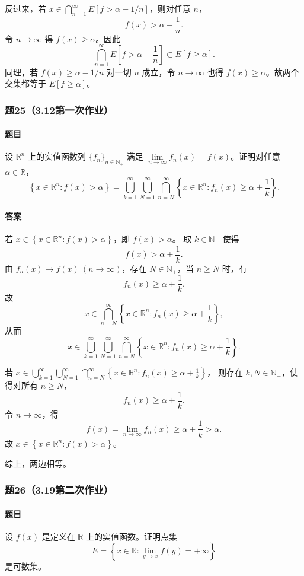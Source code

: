 \documentclass{article}
\newcommand{\R}{\mathbb{R}}
\begin{document}
	反过来，若 $x\in\bigcap_{n=1}^{\infty}E[f>\alpha-1/n]$，则对任意 $n$，
	\[
	f(x)>\alpha-\frac1n.
	\]
	令 $n\to\infty$ 得 $f(x)\ge\alpha$。因此
	\[
	\bigcap_{n=1}^{\infty}E\left[f>\alpha-\frac1n\right]
	\subset E[f\ge\alpha].
	\]
	同理，若 $f(x)\ge\alpha-1/n$ 对一切 $n$ 成立，令 $n\to\infty$ 也得 $f(x)\ge\alpha$。故两个交集都等于 $E[f\ge\alpha]$。
	
	\subsubsection*{题25（3.12第一次作业）}
	\paragraph{题目}设 $\mathbb{R}^n$ 上的实值函数列 $\{f_n\}_{n\in\mathbb{N}_+}$ 满足 $\lim\limits_{n\to\infty}f_n(x)=f(x)$。证明对任意 $\alpha\in\mathbb{R}$，
	\[
	\left\{x\in\mathbb{R}^n:f(x)>\alpha\right\}
	=
	\bigcup_{k=1}^{\infty}\bigcup_{N=1}^{\infty}
	\bigcap_{n=N}^{\infty}
	\left\{x\in\mathbb{R}^n:f_n(x)\ge \alpha+\frac1k\right\}.
	\]
	
	\paragraph{答案}若 $x\in\left\{x\in\mathbb{R}^n:f(x)>\alpha\right\}$，即 $f(x)>\alpha$。
	取 $k\in\mathbb{N}_+$ 使得
	\[
	f(x)>\alpha+\frac1k.
	\]
	由 $f_n(x)\to f(x)\ (n\to\infty)$，存在 $N\in\mathbb{N}_+$，当 $n\ge N$ 时，有
	\[
	f_n(x)\ge\alpha+\frac1k.
	\]
	故
	\[
	x\in\bigcap_{n=N}^{\infty}\left\{x\in\mathbb{R}^n:f_n(x)\ge \alpha+\frac1k\right\},
	\]
	从而
	\[
	x\in\bigcup_{k=1}^{\infty}\bigcup_{N=1}^{\infty}\bigcap_{n=N}^{\infty}\left\{x\in\mathbb{R}^n:f_n(x)\ge \alpha+\frac1k\right\}.
	\]
	
	若 $x\in\bigcup_{k=1}^{\infty}\bigcup_{N=1}^{\infty}\bigcap_{n=N}^{\infty}\left\{x\in\mathbb{R}^n:f_n(x)\ge \alpha+\frac1k\right\}$，
	则存在 $k,N\in\mathbb{N}_+$，使得对所有 $n\ge N$，
	\[
	f_n(x)\ge\alpha+\frac1k.
	\]
	令 $n\to\infty$，得
	\[
	f(x)=\lim_{n\to\infty}f_n(x)\ge\alpha+\frac1k>\alpha.
	\]
	故 $x\in\left\{x\in\mathbb{R}^n:f(x)>\alpha\right\}$。
	
	综上，两边相等。
	
	\subsubsection*{题26（3.19第二次作业）}
	\paragraph{题目}设 $f(x)$ 是定义在 $\R$ 上的实值函数。证明点集
	\[
	E=\left\{x\in\R:\lim_{y\to x}f(y)=+\infty\right\}
	\]
	是可数集。
	
\end{document}
